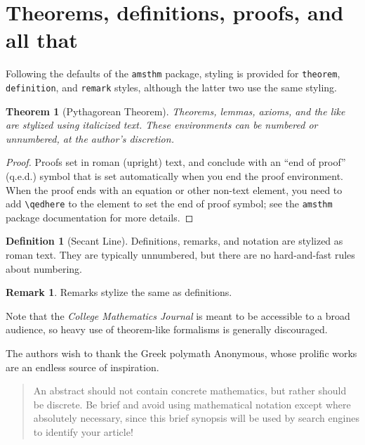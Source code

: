 \documentclass{article}
\theoremstyle{theorem}
\newtheorem{theorem}{Theorem}
\theoremstyle{definition}
\newtheorem*{definition}{Definition}
\newtheorem*{remark}{Remark}
\begin{document}
\section{Theorems, definitions, proofs, and all that}

Following the defaults of the \texttt{amsthm} package, styling is provided for \texttt{theorem}, \texttt{definition}, and \texttt{remark} styles, although the latter two use the same styling.

\begin{theorem}[Pythagorean Theorem]
Theorems, lemmas, axioms, and the like are stylized using italicized text. These environments can be numbered or unnumbered, at the author's discretion.
\end{theorem}

\begin{proof}
Proofs set in roman (upright) text, and conclude with an ``end of proof'' (q.e.d.) symbol that is set automatically when you end the proof environment.  When the proof ends with an equation or other non-text element, you need to add \verb~\qedhere~ to the element to set the end of proof symbol; see the \texttt{amsthm} package documentation for more details.
\end{proof}

\begin{definition}[Secant Line]
Definitions, remarks, and notation are stylized as roman text.  They are typically unnumbered, but there are no hard-and-fast rules about numbering.
\end{definition}

\begin{remark}
Remarks stylize the same as definitions.
\end{remark}

Note that the \textit{College Mathematics Journal\/} is meant to be accessible to a broad audience, so heavy use of theorem-like formalisms is generally discouraged.

\begin{acknowledgment}
The authors wish to thank the Greek polymath Anonymous, whose prolific works are an endless source of inspiration.
\end{acknowledgment}

\begin{abstract}
An abstract should not contain concrete mathematics, but rather should be discrete.  Be brief and avoid using mathematical notation except where absolutely necessary, since this brief synopsis will be used by search engines to identify your article!
\end{abstract}
\end{document}
